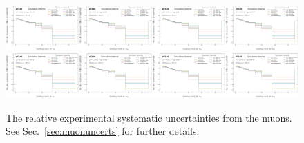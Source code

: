 \begin{figure}[h!]
\includegraphics[width=0.25\textwidth,page=17]{figures/SimResults/MultiFold_Lepton_SystEffect.pdf}\includegraphics[width=0.25\textwidth,page=18]{figures/SimResults/MultiFold_Lepton_SystEffect.pdf}\includegraphics[width=0.25\textwidth,page=19]{figures/SimResults/MultiFold_Lepton_SystEffect.pdf}\includegraphics[width=0.25\textwidth,page=20]{figures/SimResults/MultiFold_Lepton_SystEffect.pdf}\\
\includegraphics[width=0.25\textwidth,page=21]{figures/SimResults/MultiFold_Lepton_SystEffect.pdf}\includegraphics[width=0.25\textwidth,page=22]{figures/SimResults/MultiFold_Lepton_SystEffect.pdf}\includegraphics[width=0.25\textwidth,page=23]{figures/SimResults/MultiFold_Lepton_SystEffect.pdf}\includegraphics[width=0.25\textwidth,page=24]{figures/SimResults/MultiFold_Lepton_SystEffect.pdf}
\caption{The relative experimental systematic uncertainties from the muons.  See Sec.~\ref{sec:muonuncerts} for further details.}
\label{fig:simresultsmulti_muonuncerts}
\end{figure}

